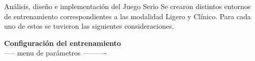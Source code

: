 \begin{thesischapter}{2} {Análisis, diseño e implementación del Juego Serio}
    Se crearon distintos entornos de entrenamiento correspondientes a las modalidad Ligero y Clínico. Para cada uno de 
    estos se tuvieron las siguientes consideraciones.

    \vspace{10pt}
    \textbf{Configuración del entrenamiento} \\ 
    ----- menu de parámetros ----------

\end{thesischapter}